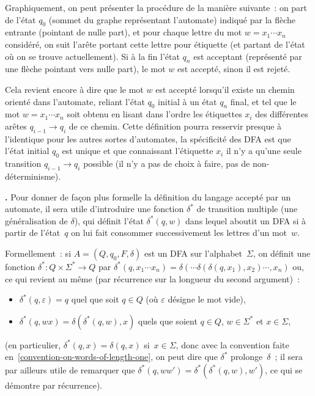 \documentclass[12pt,a4paper]{article}
\theoremstyle{definition}
\newcommand\thingy{%
\refstepcounter{comcnt}\medskip\noindent\textbf{\thecomcnt.} }
\begin{document}
\smallskip

Graphiquement, on peut présenter la procédure de la manière suivante :
on part de l'état $q_0$ (sommet du graphe représentant l'automate)
indiqué par la flèche entrante (pointant de nulle part), et pour
chaque lettre du mot $w = x_1\cdots x_n$ considéré, on suit l'arête
portant cette lettre pour étiquette (et partant de l'état où on se trouve
actuellement).  Si à la fin l'état $q_n$ est acceptant (représenté par
une flèche pointant vers nulle part), le mot $w$ est accepté, sinon il
est rejeté.

Cela revient encore à dire que le mot $w$ est accepté lorsqu'il existe
un chemin orienté dans l'automate, reliant l'état $q_0$ initial à un
état $q_n$ final, et tel que le mot $w = x_1 \cdots x_n$ soit obtenu
en lisant dans l'ordre les étiquettes $x_i$ des différentes arêtes
$q_{i-1} \to q_i$ de ce chemin.  Cette définition pourra resservir
presque à l'identique pour les autres sortes d'automates, la
spécificité des DFA est que l'état initial $q_0$ est unique et que
connaissant l'étiquette $x_i$ il n'y a qu'une seule transition
$q_{i-1} \to q_i$ possible (il n'y a pas de choix à faire, pas de
non-déterminisme).

\thingy\label{definition-multiple-transition-function} Pour donner de
façon plus formelle la définition du langage accepté par un automate,
il sera utile d'introduire une fonction $\delta^*$ de transition
multiple (une généralisation de $\delta$), qui définit l'état
$\delta^*(q,w)$ dans lequel aboutit un DFA si à partir de l'état $q$
on lui fait consommer successivement les lettres d'un mot $w$.

Formellement : si $A = (Q,q_0,F,\delta)$ est un DFA sur
l'alphabet $\Sigma$, on définit une fonction $\delta^* \colon
Q\times\Sigma^* \to Q$ par $\delta^*(q,x_1\cdots x_n) =
\delta(\cdots\delta(\delta(q,x_1),x_2)\cdots,x_n)$ ou, ce qui revient
au même (par récurrence sur la longueur du second argument) :
\begin{itemize}
\item $\delta^*(q,\varepsilon) = q$ quel que soit $q\in Q$ (où
  $\varepsilon$ désigne le mot vide),
\item $\delta^*(q,wx) = \delta(\delta^*(q,w),x)$ quels que soient
  $q\in Q$, $w\in\Sigma^*$ et $x\in\Sigma$,
\end{itemize}
(en particulier, $\delta^*(q,x) = \delta(q,x)$ si $x\in\Sigma$, donc
avec la convention faite en \ref{convention-on-words-of-length-one},
on peut dire que $\delta^*$ prolonge $\delta$ ; il sera par ailleurs
utile de remarquer que $\delta^*(q,ww') =
\delta^*(\delta^*(q,w),w')$, ce qui se démontre par récurrence).
\end{document}
